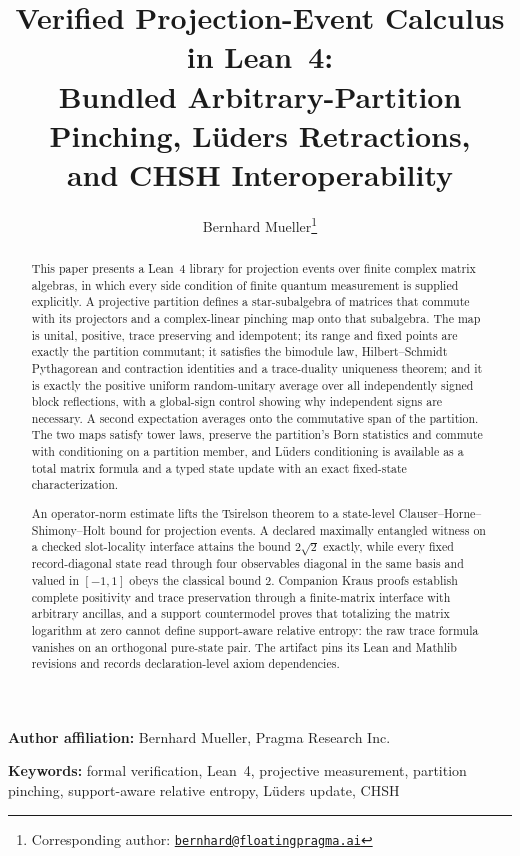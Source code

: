 \documentclass[11pt]{article}
\title{\textbf{Verified Projection-Event Calculus in Lean~4:\\
Bundled Arbitrary-Partition Pinching, L\"uders Retractions,\\
and CHSH Interoperability}}
\author{Bernhard Mueller\thanks{Corresponding author:
\href{mailto:bernhard@floatingpragma.ai}{\texttt{bernhard@floatingpragma.ai}}}}
\date{\OPHPaperReleaseDate}
\renewcommand{\_}{\textunderscore\allowbreak}
\theoremstyle{remark}
\begin{document}
\maketitle
\OPHPaperReleaseBanner

\begin{center}
\small\textbf{Author affiliation:} Bernhard Mueller, Pragma Research Inc.
\end{center}

\begin{abstract}
This paper presents a Lean~4 library for projection events over finite
complex matrix algebras, in which every side condition of finite quantum
measurement is supplied explicitly. A projective partition defines a
star-subalgebra of matrices that commute with its projectors and a
complex-linear pinching map onto that subalgebra. The map is unital,
positive, trace preserving and idempotent; its range and fixed points are
exactly the partition commutant; it satisfies the bimodule law,
Hilbert--Schmidt Pythagorean and contraction identities and a trace-duality
uniqueness theorem; and it is exactly the positive uniform random-unitary
average over all independently signed block reflections, with a global-sign
control showing why independent signs are necessary. A second expectation
averages onto the commutative span of the partition. The two maps satisfy
tower laws, preserve the partition's Born statistics and commute with
conditioning on a partition member, and L\"uders conditioning is available
as a total matrix formula and a typed state update with an exact fixed-state
characterization.

An operator-norm estimate lifts the Tsirelson theorem to a state-level
Clauser--Horne--Shimony--Holt bound for projection events. A declared
maximally entangled witness on a checked slot-locality interface attains the
bound $2\sqrt2$ exactly, while every fixed record-diagonal state read through
four observables diagonal in the same basis and valued in $[-1,1]$ obeys the
classical bound $2$. Companion Kraus proofs establish complete positivity
and trace preservation through a finite-matrix interface with arbitrary
ancillas, and a support countermodel proves that totalizing the matrix
logarithm at zero cannot define support-aware relative entropy: the raw
trace formula vanishes on an orthogonal pure-state pair. The artifact pins
its Lean and Mathlib revisions and records declaration-level axiom
dependencies.
\end{abstract}

\noindent\textbf{Keywords:} formal verification, Lean~4, projective measurement,
partition pinching, support-aware relative entropy, L\"uders update, CHSH
\end{document}
